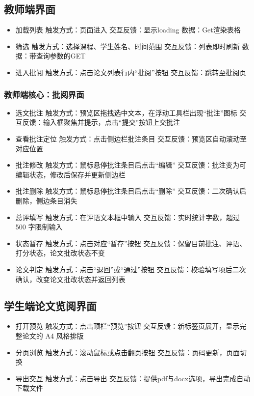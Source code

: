 \documentclass{article}
\begin{document}
\subsection{教师端界面}
\begin{itemize}
	\item 加载列表 触发方式：页面进入 交互反馈：显示loading 数据：Get渲染表格
	\item 筛选 触发方式：选择课程、学生姓名、时间范围 交互反馈：列表即时刷新 数据：带查询参数的GET
	\item 进入批阅 触发方式：点击论文列表行内“批阅”按钮 交互反馈：跳转至批阅页
\end{itemize}
\subsubsection{教师端核心：批阅界面}
\begin{itemize}
	\item 选文批注 触发方式：预览区拖拽选中文本，在浮动工具栏出现“批注”图标 交互反馈：输入框聚焦并提示，点击“提交”按钮上交批注
	\item 查看批注定位 触发方式：点击侧边栏批注条目 交互反馈：预览区自动滚动至对应位置
	\item 批注修改 触发方式：鼠标悬停批注条目后点击“编辑” 交互反馈：批注变为可编辑状态，修改后保存并更新侧边栏
	\item 批注删除 触发方式：鼠标悬停批注条目后点击“删除” 交互反馈：二次确认后删除，侧边条目消失
	\item 总评填写 触发方式：在评语文本框中输入 交互反馈：实时统计字数，超过 500 字限制输入
	\item 状态暂存 触发方式：点击对应“暂存”按钮 交互反馈：保留目前批注、评语、打分状态，论文批改状态不变
	\item 论文判定 触发方式：点击“退回”或“通过”按钮 交互反馈：校验填写项后二次确认，改变论文批改状态并返回列表
\end{itemize}
\subsection{学生端论文览阅界面}
\begin{itemize}
	\item 打开预览 触发方式：点击顶栏“预览”按钮	交互反馈：新标签页展开，显示完整论文的 A4 风格排版
	\item 分页浏览 触发方式：滚动鼠标或点击翻页按钮 交互反馈：页码更新，页面切换
	\item 导出交互 触发方式：点击导出 交互反馈：提供pdf与docx选项，导出完成自动下载文件
\end{itemize}
\end{document}
